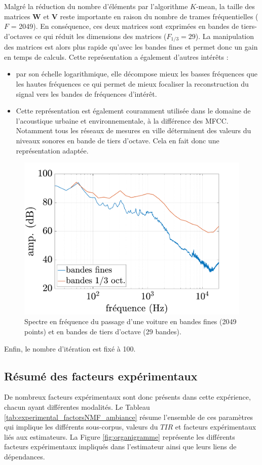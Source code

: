 Malgré la réduction du nombre d'éléments par l'algorithme $K$-mean, la taille des matrices $\mathbf{W}$ et $\mathbf{V}$ reste importante en raison du nombre de trames fréquentielles ($F$ = 2049). En conséquence, ces deux matrices sont exprimées en bandes de tiers-d'octaves ce qui réduit les dimensions des matrices ($F_{1/3} = 29$). La manipulation des matrices est alors plus rapide qu'avec les bandes fines et permet donc un gain en temps de calculs. Cette représentation a également d'autres intérêts : 

\begin{itemize}
\item par son échelle logarithmique, elle décompose mieux les basses fréquences que les hautes fréquences ce qui permet de mieux focaliser la reconstruction du signal vers les bandes de fréquences d'intérêt.
\item Cette représentation est également couramment utilisée dans le domaine de l'acoustique urbaine et environnementale, à la différence des MFCC. Notamment tous les réseaux de mesures en ville déterminent des valeurs du niveaux sonores en bande de tiers d'octave. Cela en fait donc une représentation adaptée.
\end{itemize}

\begin{figure}[h]
\centering
\includegraphics[width=0.5\linewidth]{./figures/NMF/bande_fine_tiers.pdf}
\caption{Spectre en fréquence du passage d'une voiture en bandes fines (2049 points) et en bandes de tiers d'octave (29 bandes).}
\end{figure}

Enfin, le nombre d'itération est fixé à 100. 
\subsection{Résumé des facteurs expérimentaux}

De nombreux facteurs expérimentaux sont donc présents dans cette expérience, chacun ayant différentes modalités. Le Tableau \ref{tab:experimental_factorsNMF_ambiance} résume l'ensemble de ces paramètres qui implique les différents sous-corpus, valeurs du $TIR$ et facteurs expérimentaux liés aux estimateurs. La Figure \ref{fig:organigramme} représente les différents facteurs expérimentaux impliqués dans l'estimateur ainsi que leurs liens de dépendances.

